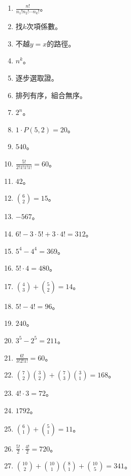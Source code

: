 \begin{enumerate}[label=\arabic*.]
    \item $\frac{n!}{n_1! n_2! \cdots n_k!}$。
    \item 找$k$次項係數。
    \item 不越$y=x$的路徑。
    \item $n^k$。
    \item 逐步選取證。
    \item 排列有序，組合無序。
    \item $2^n$。
    \item $1 \cdot P(5, 2) = 20$。
    \item $540$。
    \item $\frac{5!}{2! 1! 1! 1!} = 60$。
    \item $42$。
    \item $\binom{6}{2} = 15$。
    \item $-567$。
    \item $6! - 3 \cdot 5! + 3 \cdot 4! = 312$。
    \item $5^4 - 4^4 = 369$。
    \item $5! \cdot 4 = 480$。
    \item $\binom{4}{3} + \binom{5}{2} = 14$。
    \item $5! - 4! = 96$。
    \item $240$。
    \item $3^5 - 2^5 = 211$。
    \item $\frac{6!}{3! 2! 1!} = 60$。
    \item $\binom{7}{2} \binom{3}{2} + \binom{7}{3} \binom{3}{1} = 168$。
    \item $4! \cdot 3 = 72$。
    \item $1792$。
    \item $\binom{6}{1} + \binom{5}{1} = 11$。
    \item $\frac{5!}{2} \cdot \frac{4!}{2} = 720$。
    \item $\binom{10}{2} + \binom{10}{1} \binom{8}{1} + \binom{10}{5} = 341$。
\end{enumerate}

